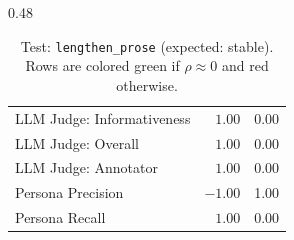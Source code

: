 \begin{table}[htbp]
\begin{subtable}[t]{0.48\textwidth}
\begin{tabular}{lrr}
\rowcolor{matchFalse} LLM Judge: Informativeness            &   $1.00$ &  0.00 \\
\rowcolor{matchFalse} LLM Judge: Overall                    &   $1.00$ &  0.00 \\
\rowcolor{matchFalse} LLM Judge: Annotator        &   $1.00$ &  0.00 \\
\rowcolor{matchFalse} Persona Precision                     &  $-1.00$ &  1.00 \\
\rowcolor{matchFalse} Persona Recall                        &   $1.00$ &  0.00 \\
\bottomrule
\end{tabular}
\caption{LLM metrics}
\end{subtable}
\caption[Test: \texttt{lengthen\_prose} (expected: stable).]{Test: \texttt{lengthen\_prose} (expected: stable). Rows are colored green if $\rho\approx0$ and red otherwise.}
\label{tab:lengthen_prose}
\end{table}


